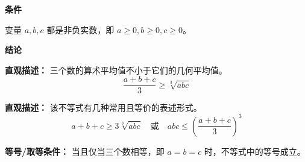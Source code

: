 \begin{statementbox}

\textbf{\textcolor{CStatement}{条件}}
\begin{description}[style=nextline, leftmargin=2.8em, labelsep=0.5em, itemsep=0.35em]
    \item[\textbf{\textcolor{CStatement}{条件 1（非负实数）：}}] 变量 $a, b, c$ 都是非负实数，即 $a \geq 0, b \geq 0, c \geq 0$。
\end{description}

\textbf{\textcolor{CStatement}{结论}}
\begin{description}[style=nextline, leftmargin=2.8em, labelsep=0.5em, itemsep=0.45em]
    \item[\textbf{\textcolor{CStatement}{结论一（三元均值不等式）：}}]
    \textbf{\textcolor{CStatement}{直观描述：}} 三个数的算术平均值不小于它们的几何平均值。
    \[
    \frac{a+b+c}{3} \geq \sqrt[3]{abc}
    \]

    \item[\textbf{\textcolor{CStatement}{推广结论（等价形式）：}}]
    \textbf{\textcolor{CStatement}{直观描述：}} 该不等式有几种常用且等价的表述形式。
    \[
    a+b+c \geq 3\sqrt[3]{abc} \quad \text{或} \quad abc \leq \left(\frac{a+b+c}{3}\right)^3
    \]
\end{description}

\textbf{\textcolor{CStatement}{等号/取等条件：}} 当且仅当三个数相等，即 $a = b = c$ 时，不等式中的等号成立。

\end{statementbox}
